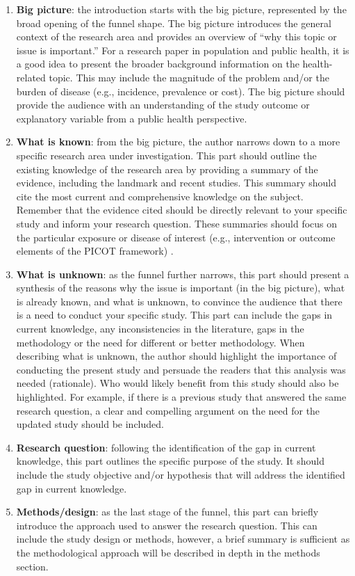 \documentclass[
]{book}
\begin{document}
\begin{enumerate}
\def\labelenumi{\arabic{enumi}.}
\item
  \textbf{Big picture}: the introduction starts with the big picture, represented by the broad opening of the funnel shape. The big picture introduces the general context of the research area and provides an overview of ``why this topic or issue is important.'' For a research paper in population and public health, it is a good idea to present the broader background information on the health-related topic. This may include the magnitude of the problem and/or the burden of disease (e.g., incidence, prevalence or cost). The big picture should provide the audience with an understanding of the study outcome or explanatory variable from a public health perspective.
\item
  \textbf{What is known}: from the big picture, the author narrows down to a more specific research area under investigation. This part should outline the existing knowledge of the research area by providing a summary of the evidence, including the landmark and recent studies. This summary should cite the most current and comprehensive knowledge on the subject. Remember that the evidence cited should be directly relevant to your specific study and inform your research question. These summaries should focus on the particular exposure or disease of interest (e.g., intervention or outcome elements of the PICOT framework) \citep{thabane2009posing}.
\item
  \textbf{What is unknown}: as the funnel further narrows, this part should present a synthesis of the reasons why the issue is important (in the big picture), what is already known, and what is unknown, to convince the audience that there is a need to conduct your specific study. This part can include the gaps in current knowledge, any inconsistencies in the literature, gaps in the methodology or the need for different or better methodology. When describing what is unknown, the author should highlight the importance of conducting the present study and persuade the readers that this analysis was needed (rationale). Who would likely benefit from this study should also be highlighted. For example, if there is a previous study that answered the same research question, a clear and compelling argument on the need for the updated study should be included.
\item
  \textbf{Research question}: following the identification of the gap in current knowledge, this part outlines the specific purpose of the study. It should include the study objective and/or hypothesis that will address the identified gap in current knowledge.
\item
  \textbf{Methods/design}: as the last stage of the funnel, this part can briefly introduce the approach used to answer the research question. This can include the study design or methods, however, a brief summary is sufficient as the methodological approach will be described in depth in the methods section.
\end{enumerate}
\end{document}
